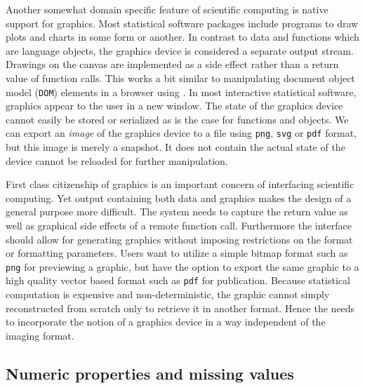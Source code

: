 Another somewhat domain specific feature of scientific computing is native support for graphics. Most statistical software packages include programs to draw plots and charts in some form or another. In contrast to data and functions which are language objects, the graphics device is considered a separate output stream. Drawings on the canvas are implemented as a side effect rather than a return value of function calls. This works a bit similar to manipulating document object model (\texttt{DOM}) elements in a browser using \JavaScript. In most interactive statistical software, graphics appear to the user in a new window. The state of the graphics device cannot easily be stored or serialized as is the case for functions and objects. We can export an \emph{image} of the graphics device to a file using \texttt{png}, \texttt{svg} or \texttt{pdf} format, but this image is merely a snapshot. It does not contain the actual state of the device cannot be reloaded for further manipulation.

First class citizenship of graphics is an important concern of interfacing scientific computing. Yet output containing both data and graphics makes the design of a general purpose \API more difficult. The system needs to capture the return value as well as graphical side effects of a remote function call. Furthermore the interface should allow for generating graphics without imposing restrictions on the format or formatting parameters. Users want to utilize a simple bitmap format such as \texttt{png} for previewing a graphic, but have the option to export the same graphic to a high quality vector based format such as \texttt{pdf} for publication. Because statistical computation is expensive and non-deterministic, the graphic cannot simply reconstructed from scratch only to retrieve it in another format. Hence the \API needs to incorporate the notion of a graphics device in a way independent of the imaging format. 

\subsection{Numeric properties and missing values}

